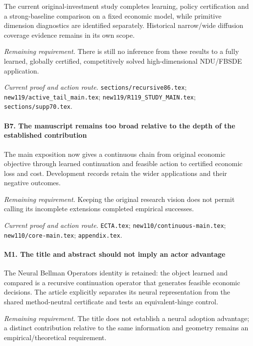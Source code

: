 The current original-investment study completes learning, policy certification and a strong-baseline comparison on a fixed economic model, while primitive dimension diagnostics are identified separately. Historical narrow/\allowbreak{}wide diffusion coverage evidence remains in its own scope.

\par\emph{Remaining requirement.} There is still no inference from these results to a fully learned, globally certified, competitively solved high-dimensional NDU/\allowbreak{}FBSDE application.

\par\emph{Current proof and action route.} \nolinkurl{sections/recursive86.tex}; \nolinkurl{new119/active_tail_main.tex}; \nolinkurl{new119/R119_STUDY_MAIN.tex}; \nolinkurl{sections/supp70.tex}.

\paragraph{B7. The manuscript remains too broad relative to the depth of the established contribution}

The main exposition now gives a continuous chain from original economic objective through learned continuation and feasible action to certified economic loss and cost. Development records retain the wider applications and their negative outcomes.

\par\emph{Remaining requirement.} Keeping the original research vision does not permit calling its incomplete extensions completed empirical successes.

\par\emph{Current proof and action route.} \nolinkurl{ECTA.tex}; \nolinkurl{new110/continuous-main.tex}; \nolinkurl{new110/core-main.tex}; \nolinkurl{appendix.tex}.

\paragraph{M1. The title and abstract should not imply an actor advantage}

The Neural Bellman Operators identity is retained: the object learned and compared is a recursive continuation operator that generates feasible economic decisions. The article explicitly separates its neural representation from the shared method-neutral certificate and tests an equivalent-hinge control.

\par\emph{Remaining requirement.} The title does not establish a neural adoption advantage; a distinct contribution relative to the same information and geometry remains an empirical/\allowbreak{}theoretical requirement.

